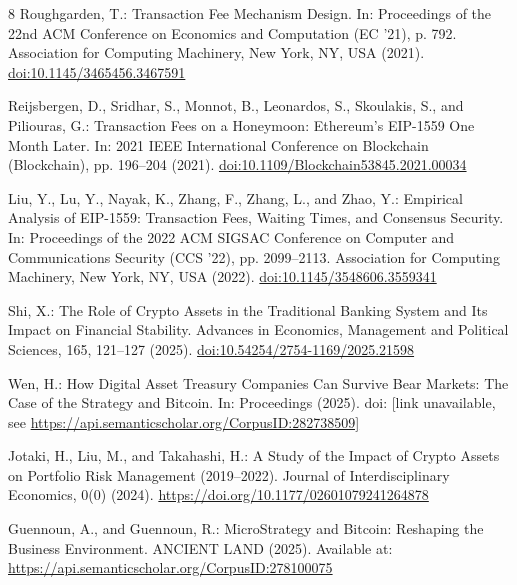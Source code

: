 \documentclass[runningheads]{llncs}
\begin{document}
\begin{thebibliography}{8}
Roughgarden, T.:
Transaction Fee Mechanism Design.
In: Proceedings of the 22nd ACM Conference on Economics and Computation (EC '21),
p. 792. Association for Computing Machinery, New York, NY, USA (2021).
\url{doi:10.1145/3465456.3467591}

Reijsbergen, D., Sridhar, S., Monnot, B., Leonardos, S., Skoulakis, S., and Piliouras, G.:
Transaction Fees on a Honeymoon: Ethereum's EIP-1559 One Month Later.
In: 2021 IEEE International Conference on Blockchain (Blockchain),
pp. 196--204 (2021).
\url{doi:10.1109/Blockchain53845.2021.00034}

Liu, Y., Lu, Y., Nayak, K., Zhang, F., Zhang, L., and Zhao, Y.:
Empirical Analysis of EIP-1559: Transaction Fees, Waiting Times, and Consensus Security.
In: Proceedings of the 2022 ACM SIGSAC Conference on Computer and Communications Security (CCS '22),
pp. 2099--2113. Association for Computing Machinery, New York, NY, USA (2022).
\url{doi:10.1145/3548606.3559341}

Shi, X.:
The Role of Crypto Assets in the Traditional Banking System and Its Impact on Financial Stability.
Advances in Economics, Management and Political Sciences, 165, 121--127 (2025).
\url{doi:10.54254/2754-1169/2025.21598}


Wen, H.:
How Digital Asset Treasury Companies Can Survive Bear Markets: The Case of the Strategy and Bitcoin.
In: Proceedings (2025).
doi: [link unavailable, see \url{https://api.semanticscholar.org/CorpusID:282738509]}

Jotaki, H., Liu, M., and Takahashi, H.:
A Study of the Impact of Crypto Assets on Portfolio Risk Management (2019--2022).
Journal of Interdisciplinary Economics, 0(0) (2024).
\url{https://doi.org/10.1177/02601079241264878}

Guennoun, A., and Guennoun, R.:
MicroStrategy and Bitcoin: Reshaping the Business Environment.
ANCIENT LAND (2025).
Available at: \url{https://api.semanticscholar.org/CorpusID:278100075}

\end{thebibliography}
\end{document}
